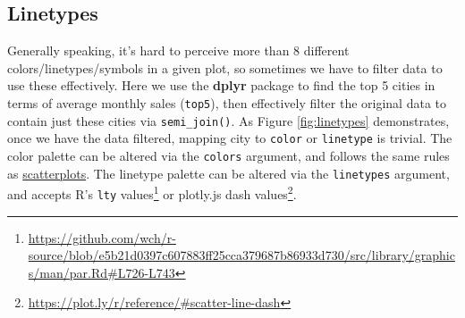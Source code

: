 \documentclass[
  12pt,
]{krantz}
\newenvironment{Shaded}{\begin{snugshade}}{\end{snugshade}}
\newcommand{\DataTypeTok}[1]{\textcolor[rgb]{0.13,0.29,0.53}{#1}}
\newcommand{\DecValTok}[1]{\textcolor[rgb]{0.00,0.00,0.81}{#1}}
\newcommand{\KeywordTok}[1]{\textcolor[rgb]{0.13,0.29,0.53}{\textbf{#1}}}
\newcommand{\NormalTok}[1]{#1}
\newcommand{\OperatorTok}[1]{\textcolor[rgb]{0.81,0.36,0.00}{\textbf{#1}}}
\newcommand{\OtherTok}[1]{\textcolor[rgb]{0.56,0.35,0.01}{#1}}
\newcommand{\StringTok}[1]{\textcolor[rgb]{0.31,0.60,0.02}{#1}}
\renewcommand{\href}[2]{#2\footnote{\url{#1}}}
\begin{document}
\hypertarget{linetypes}{%
\subsection{Linetypes}\label{linetypes}}

Generally speaking, it's hard to perceive more than 8 different colors/linetypes/symbols in a given plot, so sometimes we have to filter data to use these effectively. Here we use the \textbf{dplyr} package to find the top 5 cities in terms of average monthly sales (\texttt{top5}), then effectively filter the original data to contain just these cities via \texttt{semi\_join()}. As Figure \ref{fig:linetypes} demonstrates, once we have the data filtered, mapping city to \texttt{color} or \texttt{linetype} is trivial. The color palette can be altered via the \texttt{colors} argument, and follows the same rules as \protect\hyperlink{scatterplots}{scatterplots}. The linetype palette can be altered via the \texttt{linetypes} argument, and accepts R's \href{https://github.com/wch/r-source/blob/e5b21d0397c607883ff25cca379687b86933d730/src/library/graphics/man/par.Rd\#L726-L743}{\texttt{lty} values} or plotly.js \href{https://plot.ly/r/reference/\#scatter-line-dash}{dash values}.

\begin{Shaded}
\end{Shaded}
\end{document}
